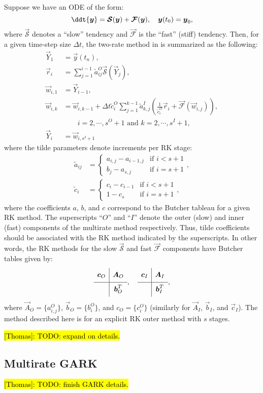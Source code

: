 \documentclass{article}
\begin{document}
Suppose we have an ODE of the form:
\begin{equation}
	\ddt{\vec{y}} = \vec{\mathcal{S}}(\vec{y}) + \vec{\mathcal{F}}(\vec{y}), \quad \vec{y}(t_0) = \vec{y}_0,
\end{equation}
where $\vec{\mathcal{S}}$ denotes a ``slow'' tendency and $\vec{\mathcal{F}}$ is the ``fast'' (stiff) tendency.
Then, for a given time-step size $\Delta t$, the two-rate method in \cite{Schlegel_2009} is summarized
as the following:
\begin{align}
	\vec{Y}_1 &= \vec{y}(t_n), \\
	\vec{r}_{i} &= \sum_{j=1}^{i-1}\tilde{a}^O_{ij}\vec{\mathcal{S}}(\vec{Y}_{j}), \\
	\vec{w}_{i,1} &= \vec{Y}_{i-1},\\
	\vec{w}_{i,k} &= \vec{w}_{i,k-1} + \Delta t \tilde{c}_i^O \sum_{j=1}^{k-1}\tilde{a}^I_{k,j}
	\left(\frac{1}{\tilde{c}_i^O}\vec{r}_i + \vec{\mathcal{F}}(\vec{w}_{i,j})\right),\\
	& \quad\quad i = 2, \cdots, s^O + 1 \text{ and } k = 2, \cdots, s^I + 1,\nonumber \\
	\vec{Y}_i &= \vec{w}_{i,s^I + 1}
\end{align}
where the tilde parameters denote increments per RK stage:
\begin{align}
	\tilde{a}_{ij} &= \begin{cases}
		a_{i,j} - a_{i-1, j} & \text{if } i < s + 1 \\
		b_j - a_{s,j} & \text{if } i = s + 1
	\end{cases},\\
	\tilde{c}_{i} &= \begin{cases}
		c_{i} - c_{i-1} & \text{if } i < s + 1 \\
		1 - c_{s} & \text{if } i = s + 1
	\end{cases},
\end{align}
where the coefficients $a$, $b$, and $c$ correspond to the Butcher tableau for a given RK method.
The superscripts ``$O$'' and ``$I$'' denote the outer (slow) and inner (fast) components of the multirate method
respectively. Thus, tilde coefficients should be associated with the RK method indicated by the superscripts.
In other words, the RK methods for the slow $\vec{\mathcal{S}}$ and fast $\vec{\mathcal{F}}$ components
have Butcher tables given by:
\begin{equation}
	\begin{array}{c|c}
	\ST \vec{c}_{O} &\vec{A}_{O} \\
	\hline
	\ST  & \vec{b}_O^T
	\end{array}, \quad
	\begin{array}{c|c}
	\ST \vec{c}_{I} &\vec{A}_{I} \\
	\hline
	\ST  & \vec{b}_I^T
	\end{array},
\end{equation}
where $\vec{A}_O = \lbrace a_{i,j}^O\rbrace$, $\vec{b}_O = \lbrace b_i^O \rbrace$, and
$c_O = \lbrace c_i^O \rbrace$ (similarly for $\vec{A}_I$, $\vec{b}_I$, and $\vec{c}_I$).
The method described here is for an explicit RK outer method with $s$ stages.

\hl{[Thomas]: TODO: expand on details.}

\subsection{Multirate GARK}
\hl{[Thomas]: TODO: finish GARK details.}



\end{document}
